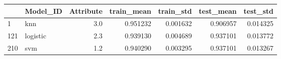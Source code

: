 \begin{tabular}{llrrrrr}
\toprule
{} &  Model\_ID &  Attribute &  train\_mean &  train\_std &  test\_mean &  test\_std \\
\midrule
1   &       knn &        3.0 &    0.951232 &   0.001632 &   0.906957 &  0.014325 \\
121 &  logistic &        2.3 &    0.939130 &   0.004689 &   0.937101 &  0.013772 \\
210 &       svm &        1.2 &    0.940290 &   0.003295 &   0.937101 &  0.013267 \\
\bottomrule
\end{tabular}
